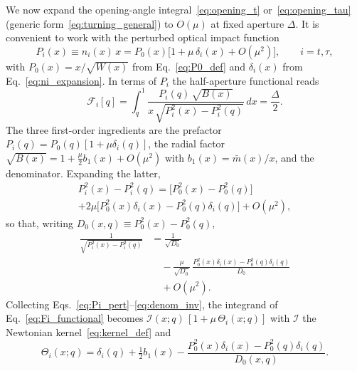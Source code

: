 \documentclass[
  aps,
  prd,
  twocolumn,
  nofootinbib,
  superscriptaddress,
  longbibliography
]{revtex4-2}
\begin{document}
We now expand the opening-angle integral~\eqref{eq:opening_t}
or~\eqref{eq:opening_tau} (generic form~\eqref{eq:turning_general}) to
$O(\mu)$ at fixed aperture $\Delta$. It is convenient to work with the
perturbed optical impact function
\begin{equation}
P_i(x)\equiv n_i(x)\,x
=
P_0(x)\bigl[1+\mu\,\delta_i(x)+O(\mu^2)\bigr],
\qquad i=t,\tau,
\label{eq:Pi_pert}
\end{equation}
with $P_0(x)=x/\sqrt{W(x)}$ from Eq.~\eqref{eq:P0_def} and $\delta_i(x)$
from Eq.~\eqref{eq:ni_expansion}. In terms of $P_i$ the half-aperture
functional reads
\begin{equation}
\mathcal{F}_i[q]
=
\int_{q}^{1}
\frac{P_i(q)\,\sqrt{B(x)}}
     {x\,\sqrt{P_i^2(x)-P_i^2(q)}}
\,dx
=
\frac{\Delta}{2}.
\label{eq:Fi_functional}
\end{equation}
The three first-order ingredients are the prefactor
$P_i(q)=P_0(q)[1+\mu\delta_i(q)]$, the radial factor
$\sqrt{B(x)}=1+\tfrac{\mu}{2}b_1(x)+O(\mu^2)$ with
$b_1(x)=\bar m(x)/x$, and the denominator. Expanding the latter,
\begin{multline}
P_i^2(x)-P_i^2(q)
=
\bigl[P_0^2(x)-P_0^2(q)\bigr]
\\
+2\mu\bigl[P_0^2(x)\delta_i(x)-P_0^2(q)\delta_i(q)\bigr]
+O(\mu^2),
\label{eq:denom_pert}
\end{multline}
so that, writing $D_0(x,q)\equiv P_0^2(x)-P_0^2(q)$,
\begin{equation}
\begin{aligned}
\frac{1}{\sqrt{P_i^2(x)-P_i^2(q)}}
&=
\frac{1}{\sqrt{D_0}}
\\
&\quad
-\frac{\mu}{\sqrt{D_0}}\,
\frac{P_0^2(x)\delta_i(x)-P_0^2(q)\delta_i(q)}{D_0}
\\
&\quad
+O(\mu^2).
\end{aligned}
\label{eq:denom_inv}
\end{equation}
Collecting Eqs.~\eqref{eq:Pi_pert}--\eqref{eq:denom_inv}, the integrand
of Eq.~\eqref{eq:Fi_functional} becomes
$\mathcal{I}(x;q)\,[1+\mu\,\Theta_i(x;q)]$ with $\mathcal{I}$ the
Newtonian kernel~\eqref{eq:kernel_def} and
\begin{equation}
\Theta_i(x;q)
=
\delta_i(q)+\tfrac{1}{2}b_1(x)
-\frac{P_0^2(x)\delta_i(x)-P_0^2(q)\delta_i(q)}{D_0(x,q)}.
\label{eq:Theta_def}
\end{equation}
\end{document}

